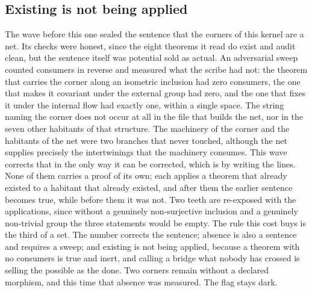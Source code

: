 \documentclass[11pt]{article}
\theoremstyle{definition}\newtheorem{deriv}{Derivation}
\begin{document}
\subsection*{Existing is not being applied}The wave before this one sealed the sentence that the corners of this kernel are a net. Its checks were honest, since the eight theorems it read do exist and audit clean, but the sentence itself was potential sold as actual. An adversarial sweep counted consumers in reverse and measured what the scribe had not: the theorem that carries the corner along an isometric inclusion had zero consumers, the one that makes it covariant under the external group had zero, and the one that fixes it under the internal flow had exactly one, within a single space. The string naming the corner does not occur at all in the file that builds the net, nor in the seven other habitants of that structure. The machinery of the corner and the habitants of the net were two branches that never touched, although the net supplies precisely the intertwinings that the machinery consumes. This wave corrects that in the only way it can be corrected, which is by writing the lines. None of them carries a proof of its own; each applies a theorem that already existed to a habitant that already existed, and after them the earlier sentence becomes true, while before them it was not. Two teeth are re-exposed with the applications, since without a genuinely non-surjective inclusion and a genuinely non-trivial group the three statements would be empty. The rule this cost buys is the third of a set. The number corrects the sentence; absence is also a sentence and requires a sweep; and existing is not being applied, because a theorem with no consumers is true and inert, and calling a bridge what nobody has crossed is selling the possible as the done. Two corners remain without a declared morphism, and this time that absence was measured. The flag stays dark.
\end{document}
